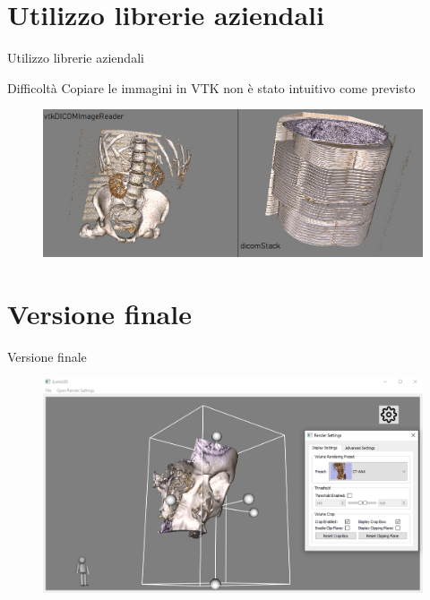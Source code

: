 \documentclass{beamer}
\begin{document}
	\section{Utilizzo librerie aziendali}
	\begin{frame}{Utilizzo librerie aziendali}
	
	\begin{alertblock}{Difficoltà}
		Copiare le immagini in VTK non è stato intuitivo come previsto
	\end{alertblock}
	
	\begin{figure}[ht]
    	\centering
    	\includegraphics[width=1\textwidth]{Images/volumebrokenorder.jpg}
	\end{figure}
	
	\end{frame}
	
	
	\section{Versione finale}
	\begin{frame}{Versione finale}
	
	\begin{figure}[ht]
    	\centering
    	\includegraphics[width=1\textwidth]{Images/finalnewui.png}
	\end{figure}
	
	\end{frame}
	
\end{document}
